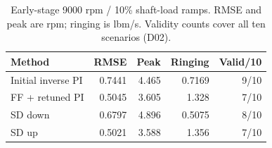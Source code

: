 \begin{table}[htbp]\centering\small\setlength{\tabcolsep}{4pt}\begin{tabular}{@{}lrrrr@{}}\toprule
Method & RMSE & Peak & Ringing & Valid/10\\\midrule
Initial inverse PI & 0.7441 & 4.465 & 0.7169 & 9/10\\
FF + retuned PI & 0.5045 & 3.605 & 1.328 & 7/10\\
SD down & 0.6797 & 4.896 & 0.5075 & 8/10\\
SD up & 0.5021 & 3.588 & 1.356 & 7/10\\
\bottomrule\end{tabular}\caption{Early-stage 9000 rpm / 10\% shaft-load ramps. RMSE and peak are rpm; ringing is lbm/s. Validity counts cover all ten scenarios (D02).}\label{tab:early_example}\end{table}